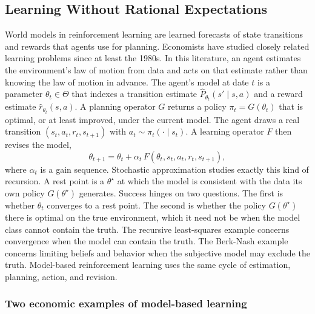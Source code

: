 \subsection{Learning Without Rational Expectations}
\label{section:fc_paradigms}

World models in reinforcement learning are learned forecasts of state transitions and rewards that agents use for planning. Economists have studied closely related learning problems since at least the 1980s. In this literature, an agent estimates the environment's law of motion from data and acts on that estimate rather than knowing the law of motion in advance. The agent's model at date $t$ is a parameter $\theta_t \in \Theta$ that indexes a transition estimate $\widehat{P}_{\theta_t}(s' \mid s, a)$ and a reward estimate $\widehat{r}_{\theta_t}(s, a)$. A planning operator $G$ returns a policy $\pi_t = G(\theta_t)$ that is optimal, or at least improved, under the current model. The agent draws a real transition $(s_t, a_t, r_t, s_{t+1})$ with $a_t \sim \pi_t(\cdot \mid s_t)$. A learning operator $F$ then revises the model,
\[
  \theta_{t+1} = \theta_t + \alpha_t \, F(\theta_t, s_t, a_t, r_t, s_{t+1}),
\]
where $\alpha_t$ is a gain sequence. Stochastic approximation studies exactly this kind of recursion. A rest point is a $\theta^\star$ at which the model is consistent with the data its own policy $G(\theta^\star)$ generates. Success hinges on two questions. The first is whether $\theta_t$ converges to a rest point. The second is whether the policy $G(\theta^\star)$ there is optimal on the true environment, which it need not be when the model class cannot contain the truth. The recursive least-squares example concerns convergence when the model can contain the truth. The Berk-Nash example concerns limiting beliefs and behavior when the subjective model may exclude the truth. Model-based reinforcement learning uses the same cycle of estimation, planning, action, and revision.

\subsubsection{Two economic examples of model-based learning}
\label{section:fc_paradigm_family}

